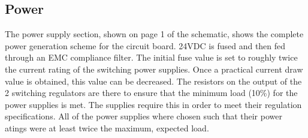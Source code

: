 \subsection {Power}
The power supply section, shown on page 1 of the schematic, shows the complete power generation scheme for the circuit board. 24VDC is fused and then fed through an EMC compliance filter\cite{5VswitchDatasheet}. The initial fuse value is set to roughly twice the current rating of the switching power supplies. Once a practical current draw value is obtained, this value can be decreased. The resistors on the output of the 2 switching regulators are there to ensure that the minimum load (10\%) for the power supplies is met. The supplies require this in order to meet their regulation specifications. All of the power supplies where chosen such that their power atings were at least twice the maximum, expected load.

